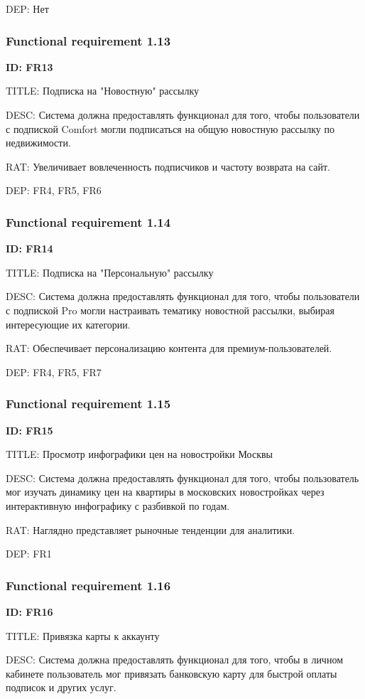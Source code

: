 \documentclass{scrreprt}
\begin{document}
DEP: Нет
\subsubsection{Functional requirement 1.13}
\textbf{ID: FR13}

TITLE: Подписка на "Новостную" рассылку

DESC: Система должна предоставлять функционал для того, чтобы пользователи с подпиской Comfort могли подписаться на общую новостную рассылку по недвижимости.

RAT: Увеличивает вовлеченность подписчиков и частоту возврата на сайт.

DEP: FR4, FR5, FR6
\subsubsection{Functional requirement 1.14}
\textbf{ID: FR14}

TITLE: Подписка на "Персональную" рассылку

DESC: Система должна предоставлять функционал для того, чтобы пользователи с подпиской Pro могли настраивать тематику новостной рассылки, выбирая интересующие их категории.

RAT: Обеспечивает персонализацию контента для премиум-пользователей.

DEP: FR4, FR5, FR7
\subsubsection{Functional requirement 1.15}
\textbf{ID: FR15}

TITLE: Просмотр инфографики цен на новостройки Москвы

DESC: Система должна предоставлять функционал для того, чтобы пользователь мог изучать динамику цен на квартиры в московских новостройках через интерактивную инфографику с разбивкой по годам.

RAT: Наглядно представляет рыночные тенденции для аналитики.

DEP: FR1
\subsubsection{Functional requirement 1.16}
\textbf{ID: FR16}

TITLE: Привязка карты к аккаунту

DESC: Система должна предоставлять функционал для того, чтобы в личном кабинете пользователь мог привязать банковскую карту для быстрой оплаты подписок и других услуг.
\end{document}
